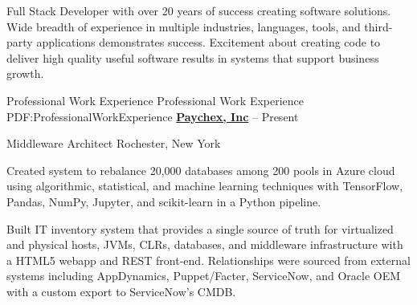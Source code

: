 \documentclass[letterpaper,MMMMyyyy,nonstopmode]{simpleresumecv}
\begin{document}
\begin{Body}

Full Stack Developer with over 20 years of success creating software solutions.
Wide breadth of experience in multiple industries, languages, tools, and third-party applications demonstrates success.
Excitement about creating code to deliver high quality useful software results in systems that support business growth.
\iffalse
\Entry
Full Stack Java architect, developer, and consultant, specializing in Java/Oracle/JavaScript
solutions and integrations.
\Gap
\textit{Technical Specialties}: Java, J2EE/JavaEE, SQL, PL/SQL, JavaScript, CSS, JMS, jQuery, jQuery UI, RabbitMQ, Oracle, Cognos, JBoss, WebLogic, AppDynamics.
\Gap
\textit{Business Specialties}: Agile team leadership, customer-focused development, requirements gathering and analysis, technical liaison, systems integration, business intelligence
\fi

\Section
{Professional\newline
Work Experience}
{Professional Work Experience}
{PDF:ProfessionalWorkExperience}
\Entry
\href{http://www.paychex.com}
{\textbf{Paychex, Inc}}
\hfill
{} -- Present

Middleware Architect %
\hfill
Rochester, New York

\begin{Detail}
\iffalse
At Paychex I work with cross-functional teams to build: an inventory system to track hosts, managed VMs, databases, and middleware appliances; machine learning systems to efficiently repack databases and to predict system utilization based on user metrics; a ground-up implementation of the Netflix Chaos Monkey; implemented AppDynamics on over 20,000 JVMs; and a system to collect and monitor JVM metrics and send alerts via SNMP and SMTP.
\fi

\BulletItem
Created system to rebalance 20,000 databases among 200 pools in Azure cloud using algorithmic, statistical, and machine learning techniques with TensorFlow, Pandas, NumPy, Jupyter, and scikit-learn in a Python pipeline.

\BulletItem
Built IT inventory system that provides a single source of truth for virtualized and physical hosts, JVMs, CLRs, databases, and middleware infrastructure with a HTML5 webapp and REST front-end. Relationships were sourced from external systems including AppDynamics, Puppet/Facter, ServiceNow, and Oracle OEM with a custom export to ServiceNow’s CMDB. 


\end{Detail}
\end{Body}
\end{document}
